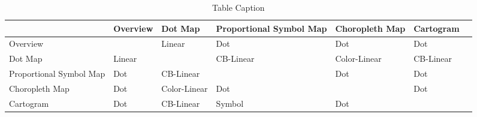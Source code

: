 \begin{table}[!htp]
    \begin{tabular}{M{22mm}||M{22mm} M{22mm} M{22mm} M{22mm} M{22mm} N}

    ~                       & Overview & Dot Map & Proportional Symbol Map & Choropleth Map & Cartogram &\\[4ex] \hline \hline

    Overview                & ~        & Linear       & Dot                       & Dot              & Dot         &\\[4ex]

    Dot Map                 & Linear        & ~       & CB-Linear                       & Color-Linear              & CB-Linear         &\\[4ex]

    Proportional Symbol Map & Dot        & CB-Linear       & ~                       & Dot              & Dot         &\\[4ex]

    Choropleth Map          & Dot        & Color-Linear       & Dot                       & ~              & Dot         &\\[4ex]

    Cartogram               & Dot        & CB-Linear       & Symbol                       & Dot              & ~         &\\[4ex]
    \end{tabular}
    \caption {Table Caption}
\end{table}









